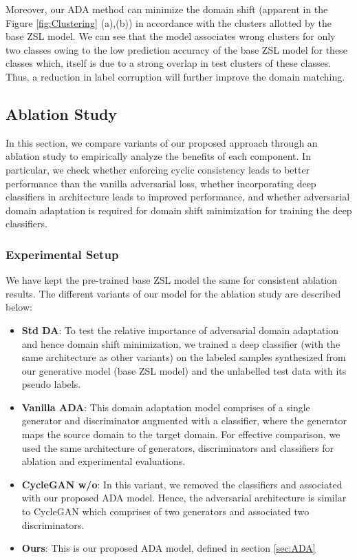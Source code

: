 \documentclass[10pt,twocolumn,letterpaper]{article}
\begin{document}
Moreover, our ADA method can minimize the domain shift (apparent in the Figure \ref{fig:Clustering} (a),(b)) in accordance with the clusters allotted by the base ZSL model. We can see that the model associates wrong clusters for only two classes owing to the low prediction accuracy of the base ZSL model for these classes which, itself is due to a strong overlap in test clusters of these classes. Thus, a reduction in label corruption will further improve the domain matching.







\subsection{Ablation Study}

In this section, we compare variants of our proposed approach through an ablation study to empirically analyze the benefits of each component. In particular, we check whether enforcing cyclic consistency leads to better performance than the vanilla adversarial loss, whether incorporating deep classifiers in architecture leads to improved performance, and whether adversarial domain adaptation is required for domain shift minimization for training the deep classifiers. 
\subsubsection{Experimental Setup}
We have kept the pre-trained base ZSL model the same for consistent ablation results. The different variants of our model for the ablation study are described below:

\begin{itemize}
    \item \textbf{Std DA}: To test the relative importance of adversarial domain adaptation and hence domain shift minimization, we trained a deep classifier (with the same architecture as other variants) on the labeled samples synthesized from our generative model (base ZSL model) and the unlabelled test data with its pseudo labels.
    \item \textbf{Vanilla ADA}: This domain adaptation model comprises of a single generator and discriminator augmented with a classifier, where the generator maps the source domain to the target domain. For effective comparison, we used the same architecture of generators, discriminators and classifiers for ablation and experimental evaluations.  
    \item \textbf{CycleGAN w/o}: In this variant, we removed the classifiers  and  associated with our proposed ADA model. Hence, the adversarial architecture is similar to CycleGAN which comprises of two generators and associated two discriminators.
    \item \textbf{Ours}: This is our proposed ADA model, defined in section \ref{sec:ADA}

\end{itemize}
\end{document}
